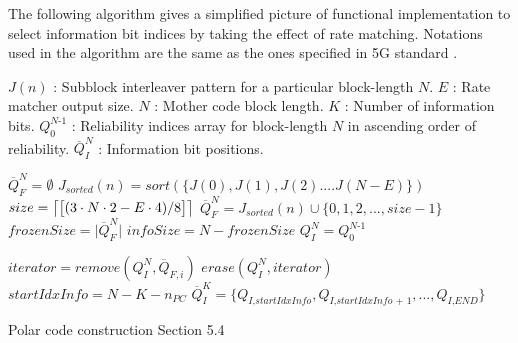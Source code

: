 The following algorithm gives a simplified picture of functional implementation to select information bit indices by taking the effect of rate matching. 
Notations used in the algorithm are the same as the ones specified in 5G standard \cite{3gpp.38.212}.

$J(n)$ : Subblock interleaver pattern for a particular block-length $N$. \newline
$E$ \hspace{0.5cm}: Rate matcher output size. \newline
$N$ \hspace{0.45cm}: Mother code block length. \newline
$K$ \hspace{0.45cm}: Number of information bits.\newline
$Q_{\textit{0}}^{\textit{N-1}}$ : Reliability indices array for block-length $N$ in ascending order of reliability. \newline
$\overline{Q}_{\textit{I}}^{\textit{N}}$\hspace{0.25cm} : Information bit positions. \newline


\IncMargin{1.5em}
\begin{algorithm}[!h]
	$\overline{Q}_{\textit{F}}^{\textit{N}} = \emptyset$ \;
	 {
		 {   %
			$J_{sorted}(n) = sort(\{J(0),J(1),J(2)....J(N-E)\})$\;  \label{line:subblockRef1}
			 {
				$size = \ceil*{\big[(3\cdot N\cdot 2 - E\cdot 4)/8\big]}$\;
				$\overline{Q}_{F}^{N} = J_{sorted}(n) \cup \{0,1,2, ... ,size-1\}$ \label{line:subblockRef2}
			} 	
		} 
	}
	$frozenSize = \big|\overline{Q}_{F}^{N}\big|$ \;
	$infoSize = N - frozenSize$ \;
	$Q_{\textit{I}}^{\textit{N}} = Q_{\textit{0}}^{\textit{N-1}}$ \;
	
	 {
		$iterator = remove(Q_{\textit{I}}^{\textit{N}},\overline{Q}_{F,i})$ \;
		$erase(Q_{\textit{I}}^{\textit{N}},iterator)$ \;
	}
	$startIdxInfo = N - K - n_{PC}$ \;
	$\overline{Q}_{\textit{I}}^{\textit{K}} = \{Q_{\textit{I,startIdxInfo}},Q_{\textit{I,startIdxInfo + 1}},...,Q_{\textit{I,END}}\}$
	\caption{Polar code construction \cite{3gpp.38.212} Section 5.4}
	\label{algo:polarCodeConstuctionAlgo}
\end{algorithm}
\DecMargin{1.5em}

